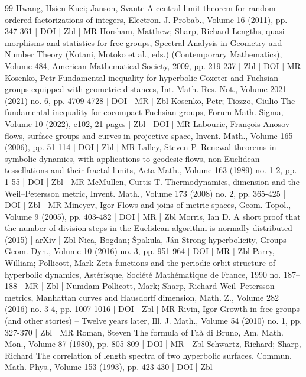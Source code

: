 \documentclass[10pt]{amsart}
\theoremstyle{definition}\newtheorem{defi}[theo]{Definition}\newtheorem{rema}[theo]{Remark}\newtheorem{exam}[theo]{Example}\newtheorem{exem}[theo]{Example}\newtheorem{nota}[theo]{Notation}
\theoremstyle{plain}
\begin{document}
\begin{thebibliography}{99}
 Hwang, Hsien-Kuei; Janson, Svante A central limit theorem for random ordered factorizations of integers, Electron. J. Probab., Volume 16 (2011), pp. 347-361 | DOI | Zbl | MR
 Horsham, Matthew; Sharp, Richard Lengths, quasi-morphisms and statistics for free groups, Spectral Analysis in Geometry and Number Theory (Kotani, Motoko et al., eds.) (Contemporary Mathematics), Volume 484, American Mathematical Society, 2009, pp. 219-237 | Zbl | DOI | MR
 Kosenko, Petr Fundamental inequality for hyperbolic Coxeter and Fuchsian groups equipped with geometric distances, Int. Math. Res. Not., Volume 2021 (2021) no. 6, pp. 4709-4728 | DOI | MR | Zbl
 Kosenko, Petr; Tiozzo, Giulio The fundamental inequality for cocompact Fuchsian groups, Forum Math. Sigma, Volume 10 (2022), e102, 21 pages | Zbl | DOI | MR
 Labourie, François Anosov flows, surface groups and curves in projective space, Invent. Math., Volume 165 (2006), pp. 51-114 | DOI | Zbl | MR
 Lalley, Steven P. Renewal theorems in symbolic dynamics, with applications to geodesic flows, non-Euclidean tessellations and their fractal limits, Acta Math., Volume 163 (1989) no. 1-2, pp. 1-55 | DOI | Zbl | MR
 McMullen, Curtis T. Thermodynamics, dimension and the Weil–Petersson metric, Invent. Math., Volume 173 (2008) no. 2, pp. 365-425 | DOI | Zbl | MR
 Mineyev, Igor Flows and joins of metric spaces, Geom. Topol., Volume 9 (2005), pp. 403-482 | DOI | MR | Zbl
 Morris, Ian D. A short proof that the number of division steps in the Euclidean algorithm is normally distributed (2015) | arXiv | Zbl
 Nica, Bogdan; Špakula, Ján Strong hyperbolicity, Groups Geom. Dyn., Volume 10 (2016) no. 3, pp. 951-964 | DOI | MR | Zbl
 Parry, William; Pollicott, Mark Zeta functions and the periodic orbit structure of hyperbolic dynamics, Astérisque, Société Mathématique de France, 1990 no. 187–188 | MR | Zbl | Numdam
 Pollicott, Mark; Sharp, Richard Weil–Petersson metrics, Manhattan curves and Hausdorff dimension, Math. Z., Volume 282 (2016) no. 3-4, pp. 1007-1016 | DOI | Zbl | MR
 Rivin, Igor Growth in free groups (and other stories) – Twelve years later, Ill. J. Math., Volume 54 (2010) no. 1, pp. 327-370 | Zbl | MR
 Roman, Steven The formula of Faà di Bruno, Am. Math. Mon., Volume 87 (1980), pp. 805-809 | DOI | MR | Zbl
 Schwartz, Richard; Sharp, Richard The correlation of length spectra of two hyperbolic surfaces, Commun. Math. Phys., Volume 153 (1993), pp. 423-430 | DOI | Zbl
\end{thebibliography}
\end{document}
